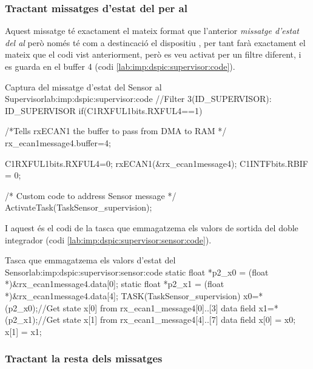 \subsubsection{Tractant missatges d'estat del \Sensor per al \Supervisor}\label{lab:imp:dspic:ID_SUPERVISOR}

Aquest missatge té exactament el mateix format que l'anterior \emph{missatge d'estat del \Sensor al \Controlador} però només té com a destincació el dispositiu \Monitor, per tant farà exactament el mateix que el codi vist anteriorment, però es veu activat per un filtre diferent, i es guarda en el buffer 4 (codi \ref{lab:imp:dspic:supervisor:code}).

\begin{code_c}{Captura del missatge d'estat del Sensor al Supervisor}{lab:imp:dspic:supervisor:code}
//Filter 3(ID_SUPERVISOR): ID_SUPERVISOR
if(C1RXFUL1bits.RXFUL4==1)
{
	/*Tells rxECAN1 the buffer to pass from DMA to RAM */
	rx_ecan1message4.buffer=4;

	C1RXFUL1bits.RXFUL4=0;
	rxECAN1(&rx_ecan1message4);
	C1INTFbits.RBIF = 0;

	/* Custom code to address Sensor message */
	ActivateTask(TaskSensor_supervision);
}
\end{code_c}

I aquest és el codi de la tasca que emmagatzema els valors de sortida del doble integrador (codi \ref{lab:imp:dspic:supervisor:sensor:code}).

\begin{code_c}{Tasca que emmagatzema els valors d'estat del Sensor}{lab:imp:dspic:supervisor:sensor:code}
static float *p2_x0 = (float *)&rx_ecan1message4.data[0];
static float *p2_x1 = (float *)&rx_ecan1message4.data[4];
TASK(TaskSensor_supervision)
{
	x0=*(p2_x0);//Get state x[0] from rx_ecan1_message4[0]..[3] data field
	x1=*(p2_x1);//Get state x[1] from rx_ecan1_message4[4]..[7] data field
	x[0] = x0;
	x[1] = x1;
}
\end{code_c}

\subsubsection{Tractant la resta dels missatges}\label{lab:imp:dspic:ALL_ID}

